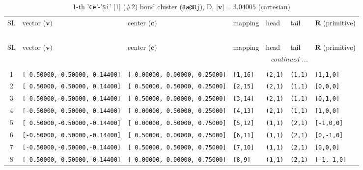 \documentclass[fleqn,10pt,landscape]{jsarticle}
\begin{document}
\renewcommand{\arraystretch}{1.6}
\begin{longtable}[l]{cllllll}
\captionsetup{justification=raggedright, singlelinecheck=off}
\caption{1-th '\texttt{Ce}'-'\texttt{Si}' [1] (\#2) bond cluster (\texttt{8a@8j}), D, $|\bm{v}|=3.04005$ (cartesian)}
 \\
 \hline \hline
SL & vector ($\bm{v})$ & center ($\bm{c})$ & mapping & head & tail & $\bm{R}$ (primitive) \\ \hline \endfirsthead

\multicolumn{6}{l}{\tablename\ \thetable{}} \\
 \hline \hline
SL & vector ($\bm{v})$ & center ($\bm{c})$ & mapping & head & tail & $\bm{R}$ (primitive) \\ \hline \endhead

 \hline \hline
\multicolumn{6}{r}{\footnotesize\it continued ...} \\ \endfoot

 \hline \hline
\multicolumn{6}{r}{} \\ \endlastfoot

1 & \texttt{[-0.50000,-0.50000, 0.14400]} & \texttt{[ 0.00000, 0.00000, 0.25000]} & \texttt{[1,16]} & \texttt{(2,1)} & \texttt{(1,1)} & \texttt{[1,1,0]} \\ \hline
2 & \texttt{[ 0.50000, 0.50000, 0.14400]} & \texttt{[ 0.50000, 0.50000, 0.25000]} & \texttt{[2,15]} & \texttt{(2,1)} & \texttt{(1,1)} & \texttt{[0,0,0]} \\ \hline
3 & \texttt{[ 0.50000,-0.50000, 0.14400]} & \texttt{[ 0.50000, 0.00000, 0.25000]} & \texttt{[3,14]} & \texttt{(2,1)} & \texttt{(1,1)} & \texttt{[0,1,0]} \\ \hline
4 & \texttt{[-0.50000, 0.50000, 0.14400]} & \texttt{[ 0.00000, 0.50000, 0.25000]} & \texttt{[4,13]} & \texttt{(2,1)} & \texttt{(1,1)} & \texttt{[1,0,0]} \\ \hline
5 & \texttt{[ 0.50000,-0.50000,-0.14400]} & \texttt{[ 0.00000, 0.50000, 0.75000]} & \texttt{[5,12]} & \texttt{(1,1)} & \texttt{(2,1)} & \texttt{[-1,0,0]} \\ \hline
6 & \texttt{[-0.50000, 0.50000,-0.14400]} & \texttt{[ 0.50000, 0.00000, 0.75000]} & \texttt{[6,11]} & \texttt{(1,1)} & \texttt{(2,1)} & \texttt{[0,-1,0]} \\ \hline
7 & \texttt{[-0.50000,-0.50000,-0.14400]} & \texttt{[ 0.50000, 0.50000, 0.75000]} & \texttt{[7,10]} & \texttt{(1,1)} & \texttt{(2,1)} & \texttt{[0,0,0]} \\ \hline
8 & \texttt{[ 0.50000, 0.50000,-0.14400]} & \texttt{[ 0.00000, 0.00000, 0.75000]} & \texttt{[8,9]} & \texttt{(1,1)} & \texttt{(2,1)} & \texttt{[-1,-1,0]} \\
\end{longtable}
\end{document}
